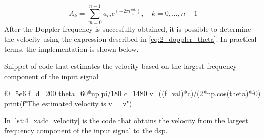 \begin{equation} \label{eq:numpy_dft_formula}
	A_{k} = \sum_{m=0}^{n-1} a_{m} e^{\left( -2\pi i \frac{mk}{n}\right)}, \quad k=0,...,n-1
\end{equation}
After the Doppler frequency is succesfully obtained, it is possible to determine the velocity using the expression described in \cref{eq:2_doppler_theta}. In practical terms, the implementation is shown below.
\begin{listing}[htbp]
	\centering
	\caption{Snippet of code that estimates the velocity based on the largest frequency component of the input signal}
	\label{lst:4_xadc_velocity}
	\begin{mintedpython}
f0=5e6
f_d=200
theta=60*np.pi/180
c=1480
v=((f_val)*c)/(2*np.cos(theta)*f0)
print(f"The estimated velocity is v = {v}")
	\end{mintedpython}
\end{listing}
In \cref{lst:4_xadc_velocity} is the code that obtains the velocity from the largest frequency component of the input signal to the \gls{dsp}.